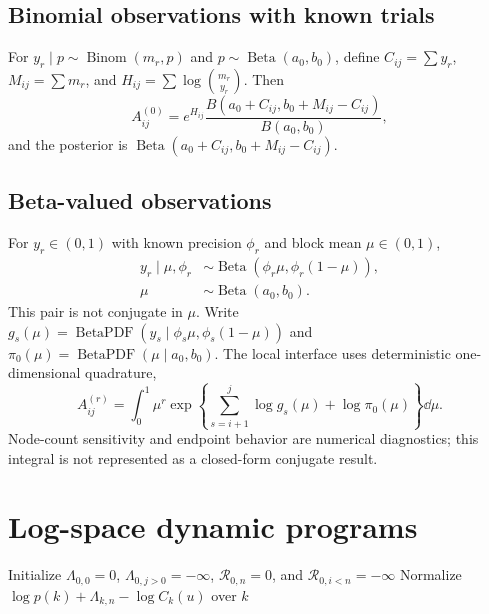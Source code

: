 \subsection{Binomial observations with known trials}
For $y_r\mid p\sim\operatorname{Binom}(m_r,p)$ and $p\sim\operatorname{Beta}(a_0,b_0)$, define $C_{ij}=\sum y_r$, $M_{ij}=\sum m_r$, and $H_{ij}=\sum\log\binom{m_r}{y_r}$. Then
\begin{equation}
A^{(0)}_{ij}
=e^{H_{ij}}
\frac{B(a_0+C_{ij},b_0+M_{ij}-C_{ij})}{B(a_0,b_0)},
\label{eq:binomial-block-app}
\end{equation}
and the posterior is $\operatorname{Beta}(a_0+C_{ij},b_0+M_{ij}-C_{ij})$.

\subsection{Beta-valued observations}
For $y_r\in(0,1)$ with known precision $\phi_r$ and block mean $\mu\in(0,1)$,
\begin{align*}
y_r\mid\mu,\phi_r
&\sim\operatorname{Beta}(\phi_r\mu,\phi_r(1-\mu)),\\
\mu&\sim\operatorname{Beta}(a_0,b_0).
\end{align*}
This pair is not conjugate in $\mu$. Write
$g_s(\mu)=\operatorname{BetaPDF}(y_s\mid\phi_s\mu,\phi_s(1-\mu))$
and $\pi_0(\mu)=\operatorname{BetaPDF}(\mu\mid a_0,b_0)$. The local interface uses deterministic one-dimensional quadrature,
\begin{equation}
A^{(r)}_{ij}
=\int_0^1\mu^r
\exp\!\left\{\sum_{s=i+1}^{j}\log g_s(\mu)+\log\pi_0(\mu)\right\}\dd\mu.
\label{eq:betaobs-block-app}
\end{equation}
Node-count sensitivity and endpoint behavior are numerical diagnostics; this integral is not represented as a closed-form conjugate result.

\ifSAIMPaperTwoColumn
\clearpage
\onecolumn
\fi
\section{Log-space dynamic programs}
\label{app:algorithms}

\begin{algorithm}[H]
\caption{Log-space sum-product messages}
\label{alg:log-sum-product-app}
Initialize $\Lambda_{0,0}=0$, $\Lambda_{0,j>0}=-\infty$, $\mathcal R_{0,n}=0$, and $\mathcal R_{0,i<n}=-\infty$\;
Normalize $\log p(k)+\Lambda_{k,n}-\log C_k(u)$ over $k$\;
\end{algorithm}

